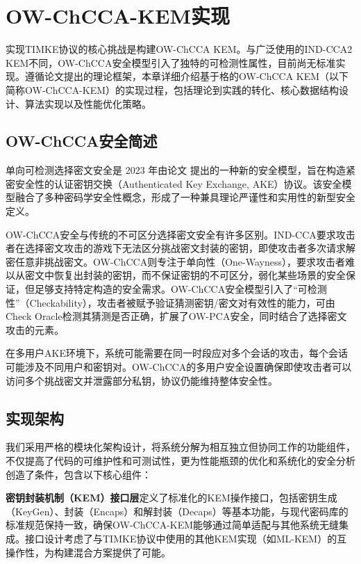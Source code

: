 \section{OW-ChCCA-KEM实现}
\label{chap:owchccakem}

实现TIMKE协议的核心挑战是构建OW-ChCCA KEM。与广泛使用的IND-CCA2 KEM不同，OW-ChCCA安全模型引入了独特的可检测性属性，目前尚无标准实现。遵循论文\cite{pan_lattice-based_2023}提出的理论框架，本章详细介绍基于格的OW-ChCCA KEM（以下简称OW-ChCCA-KEM）的实现过程，包括理论到实践的转化、核心数据结构设计、算法实现以及性能优化策略。

\subsection{OW-ChCCA安全简述}

单向可检测选择密文安全是 2023 年由论文 \cite{pan_lattice-based_2023} 提出的一种新的安全模型，旨在构造紧密安全性的认证密钥交换（Authenticated Key Exchange, AKE）协议。该安全模型融合了多种密码学安全性概念，形成了一种兼具理论严谨性和实用性的新型安全定义。

OW-ChCCA安全与传统的不可区分选择密文安全有许多区别。IND-CCA要求攻击者在选择密文攻击的游戏下无法区分挑战密文封装的密钥，即使攻击者多次请求解密任意非挑战密文。OW-ChCCA则专注于单向性（One-Wayness），要求攻击者难以从密文中恢复出封装的密钥，而不保证密钥的不可区分，弱化某些场景的安全保证，但足够支持特定构造的安全需求。OW-ChCCA安全模型引入了“可检测性”（Checkability），攻击者被赋予验证猜测密钥/密文对有效性的能力，可由Check Oracle检测其猜测是否正确，扩展了OW-PCA安全，同时结合了选择密文攻击的元素。

在多用户AKE环境下，系统可能需要在同一时段应对多个会话的攻击，每个会话可能涉及不同用户和密钥对。OW-ChCCA的多用户安全设置确保即使攻击者可以访问多个挑战密文并泄露部分私钥，协议仍能维持整体安全性。

\subsection{实现架构}

我们采用严格的模块化架构设计，将系统分解为相互独立但协同工作的功能组件，不仅提高了代码的可维护性和可测试性，更为性能瓶颈的优化和系统化的安全分析创造了条件，包含以下核心组件：

\textbf{密钥封装机制（KEM）接口层}定义了标准化的KEM操作接口，包括密钥生成（KeyGen）、封装（Encaps）和解封装（Decaps）等基本功能，与现代密码库的标准规范保持一致，确保OW-ChCCA-KEM能够通过简单适配与其他系统无缝集成。接口设计考虑了与TIMKE协议中使用的其他KEM实现（如ML-KEM）的互操作性，为构建混合方案提供了可能。

